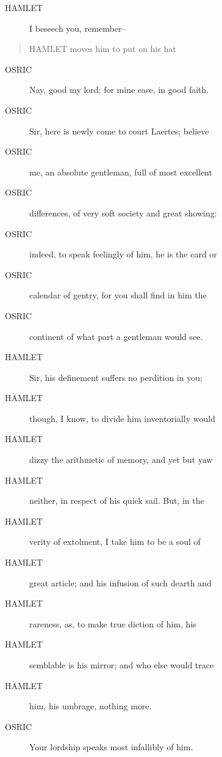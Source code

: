 \documentclass{article}
\begin{document}
\begin{description}
            
\item[HAMLET] I beseech you, remember--
\end{description}
          
\begin{quote}
HAMLET moves him to put on his hat
\end{quote}
          
\begin{description}
            
\item[OSRIC] Nay, good my lord; for mine ease, in good faith.
\item[OSRIC] Sir, here is newly come to court Laertes; believe
\item[OSRIC] me, an absolute gentleman, full of most excellent
\item[OSRIC] differences, of very soft society and great showing:
\item[OSRIC] indeed, to speak feelingly of him, he is the card or
\item[OSRIC] calendar of gentry, for you shall find in him the
\item[OSRIC] continent of what part a gentleman would see.
\end{description}
          
\begin{description}
            
\item[HAMLET] Sir, his definement suffers no perdition in you;
\item[HAMLET] though, I know, to divide him inventorially would
\item[HAMLET] dizzy the arithmetic of memory, and yet but yaw
\item[HAMLET] neither, in respect of his quick sail. But, in the
\item[HAMLET] verity of extolment, I take him to be a soul of
\item[HAMLET] great article; and his infusion of such dearth and
\item[HAMLET] rareness, as, to make true diction of him, his
\item[HAMLET] semblable is his mirror; and who else would trace
\item[HAMLET] him, his umbrage, nothing more.
\end{description}
          
\begin{description}
            
\item[OSRIC] Your lordship speaks most infallibly of him.
\end{description}
          
\end{document}

